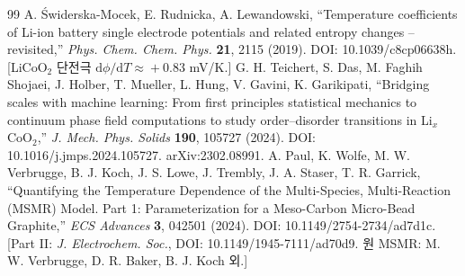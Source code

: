 \documentclass[11pt,a4paper]{article}
\newcommand{\dd}{\mathrm{d}}
\begin{document}
\begin{thebibliography}{99}
 A. {\'S}widerska-Mocek, E. Rudnicka, A. Lewandowski, ``Temperature coefficients of Li-ion battery single electrode potentials and related entropy changes -- revisited,'' \emph{Phys. Chem. Chem. Phys.} \textbf{21}, 2115 (2019). DOI: 10.1039/c8cp06638h. [LiCoO$_2$ 단전극 $\dd\phi/\dd T\!\approx\!+0.83$ mV/K.]
 G. H. Teichert, S. Das, M. Faghih Shojaei, J. Holber, T. Mueller, L. Hung, V. Gavini, K. Garikipati, ``Bridging scales with machine learning: From first principles statistical mechanics to continuum phase field computations to study order--disorder transitions in Li$_x$CoO$_2$,'' \emph{J. Mech. Phys. Solids} \textbf{190}, 105727 (2024). DOI: 10.1016/j.jmps.2024.105727. arXiv:2302.08991.
 A. Paul, K. Wolfe, M. W. Verbrugge, B. J. Koch, J. S. Lowe, J. Trembly, J. A. Staser, T. R. Garrick, ``Quantifying the Temperature Dependence of the Multi-Species, Multi-Reaction (MSMR) Model. Part 1: Parameterization for a Meso-Carbon Micro-Bead Graphite,'' \emph{ECS Advances} \textbf{3}, 042501 (2024). DOI: 10.1149/2754-2734/ad7d1c. [Part II: \emph{J. Electrochem. Soc.}, DOI: 10.1149/1945-7111/ad70d9. 원 MSMR: M. W. Verbrugge, D. R. Baker, B. J. Koch 외.]
\end{thebibliography}
\end{document}
